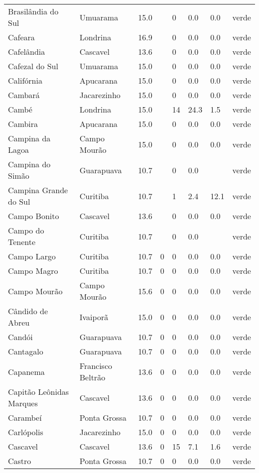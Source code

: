 \begin{longtable}{l|lllllll}
  Brasilândia do Sul & Umuarama & 15.0 &  & 0 & 0.0 & 0.0 & verde \\ 
  Cafeara & Londrina & 16.9 &  & 0 & 0.0 & 0.0 & verde \\ 
  Cafelândia & Cascavel & 13.6 &  & 0 & 0.0 & 0.0 & verde \\ 
  Cafezal do Sul & Umuarama & 15.0 &  & 0 & 0.0 & 0.0 & verde \\ 
  Califórnia & Apucarana & 15.0 &  & 0 & 0.0 & 0.0 & verde \\ 
  Cambará & Jacarezinho & 15.0 &  & 0 & 0.0 & 0.0 & verde \\ 
  Cambé & Londrina & 15.0 &  & 14 & 24.3 & 1.5 & verde \\ 
  Cambira & Apucarana & 15.0 &  & 0 & 0.0 & 0.0 & verde \\ 
  Campina da Lagoa & Campo Mourão & 15.0 &  & 0 & 0.0 & 0.0 & verde \\ 
  Campina do Simão & Guarapuava & 10.7 &  & 0 & 0.0 &  & verde \\ 
  Campina Grande do Sul & Curitiba & 10.7 &  & 1 & 2.4 & 12.1 & verde \\ 
  Campo Bonito & Cascavel & 13.6 &  & 0 & 0.0 & 0.0 & verde \\ 
  Campo do Tenente & Curitiba & 10.7 &  & 0 & 0.0 &  & verde \\ 
  Campo Largo & Curitiba & 10.7 & 0 & 0 & 0.0 & 0.0 & verde \\ 
  Campo Magro & Curitiba & 10.7 & 0 & 0 & 0.0 & 0.0 & verde \\ 
  Campo Mourão & Campo Mourão & 15.6 & 0 & 0 & 0.0 & 0.0 & verde \\ 
  Cândido de Abreu & Ivaiporã & 15.0 & 0 & 0 & 0.0 & 0.0 & verde \\ 
  Candói & Guarapuava & 10.7 & 0 & 0 & 0.0 & 0.0 & verde \\ 
  Cantagalo & Guarapuava & 10.7 & 0 & 0 & 0.0 & 0.0 & verde \\ 
  Capanema & Francisco Beltrão & 13.6 & 0 & 0 & 0.0 & 0.0 & verde \\ 
  Capitão Leônidas Marques & Cascavel & 13.6 & 0 & 0 & 0.0 & 0.0 & verde \\ 
  Carambeí & Ponta Grossa & 10.7 & 0 & 0 & 0.0 & 0.0 & verde \\ 
  Carlópolis & Jacarezinho & 15.0 & 0 & 0 & 0.0 & 0.0 & verde \\ 
  Cascavel & Cascavel & 13.6 & 0 & 15 & 7.1 & 1.6 & verde \\ 
  Castro & Ponta Grossa & 10.7 & 0 & 0 & 0.0 & 0.0 & verde \\ 

\end{longtable}
